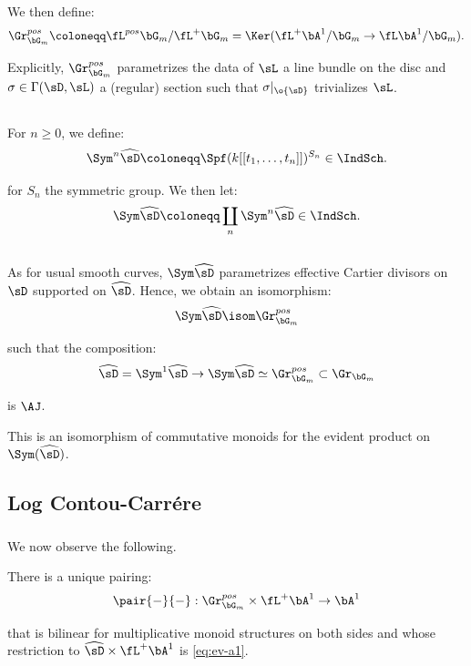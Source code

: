 We then define:
%
\[
\Gr_{\bG_m}^{pos} \coloneqq \fL^{pos} \bG_m/\fL^+ \bG_m =
\Ker(\fL^+\bA^1/\bG_m \to \fL \bA^1/\bG_m).
\]

Explicitly, $\Gr_{\bG_m}^{pos}$ parametrizes
the data of $\sL$ a line bundle on the disc and
$\sigma \in \Gamma(\sD,\sL)$ a (regular) section
such that $\sigma|_{\o{\sD}}$ trivializes $\sL$.

\subsection{}

For $n \geq 0$, we define:
%
\[
\Sym^n \widehat{\sD} \coloneqq \Spf(k[[t_1,\ldots,t_n]])^{S_n}
\in \IndSch.
\]

 for $S_n$ the symmetric group.
We then let:
%
\[
\Sym\widehat{\sD} \coloneqq
\coprod_n \Sym^n \widehat{\sD} \in \IndSch.
\]

\subsection{}

As for usual smooth curves, $\Sym\widehat{\sD}$ parametrizes
effective Cartier divisors on $\sD$ supported on $\widehat{\sD}$.
Hence, we obtain an isomorphism:
%
\[
\Sym\widehat{\sD} \isom \Gr_{\bG_m}^{pos}
\]

 such that the composition:
%
\[
\widehat{\sD} = \Sym^1 \widehat{\sD} \to
\Sym\widehat{\sD} \simeq \Gr_{\bG_m}^{pos}
\subset \Gr_{\bG_m}
\]

 is $\AJ$.

This is an isomorphism of commutative monoids for the
evident product on $\Sym(\widehat{\sD})$.

\subsection{Log Contou-Carr\'ere}

\subsubsection{}

We now observe the following.

There is a unique pairing:
%
\[
\pair{-}{-}:\Gr_{\bG_m}^{pos} \times \fL^+ \bA^1 \to \bA^1
\]

 that is bilinear for multiplicative monoid
structures on both sides and whose restriction
to $\widehat{\sD} \times \fL^+ \bA^1$ is
\eqref{eq:ev-a1}.

